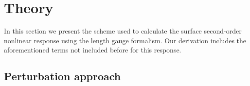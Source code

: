 \documentclass[floatfix,prb,aps,superscriptaddress,showpacs,letterpaper]{revtex4}
\begin{document}

\section{Theory}

\label{theory}

In this section we present the scheme used to calculate the surface 
second-order nonlinear response using the length gauge formalism. Our 
derivation includes the aforementioned terms not included before for 
this response. 

\subsection{Perturbation approach}
\end{document}
